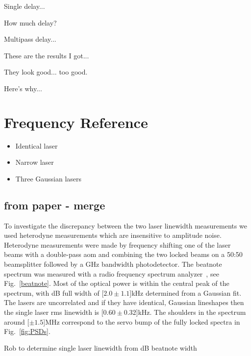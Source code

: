 Single delay...

How much delay?

Multipass delay...

These are the results I got...

They look good... too good.

Here's why...\cite{richter_linewidth_1986}

\section{Frequency Reference}
\begin{itemize}
\item Identical laser
\item Narrow laser
\item Three Gaussian lasers
\end{itemize}

\subsection{from paper - merge}
To investigate the discrepancy between the two laser linewidth measurements we used heterodyne measurements which are insensitive to amplitude noise.
Heterodyne measurements were made by frequency shifting one of the laser beams with a double-pass \gls*{aom} and combining the two locked beams on a 50:50 beamsplitter followed by a \unit[1]{GHz} bandwidth photodetector.
The beatnote spectrum was measured with a radio frequency spectrum analyzer~\cite{equipment}, see Fig.~\ref{beatnote}.
Most of the optical power is within the central peak of the spectrum, with \unit[-3]{dB} full width of \unit[$2.0\pm1.1$]{kHz} determined from a Gaussian fit.
The lasers are uncorrelated and if they have identical, Gaussian lineshapes then the single laser \gls*{rms} linewidth is \unit[$0.60\pm0.32$]{kHz}.
The shoulders in the spectrum around \unit[$\pm1.5$]{MHz} correspond to the servo bump of the fully locked spectra in Fig.~\ref{fig:PSDs}.

{\color{red} Rob to determine single laser linewidth from \unit[-3]{dB} beatnote width}

